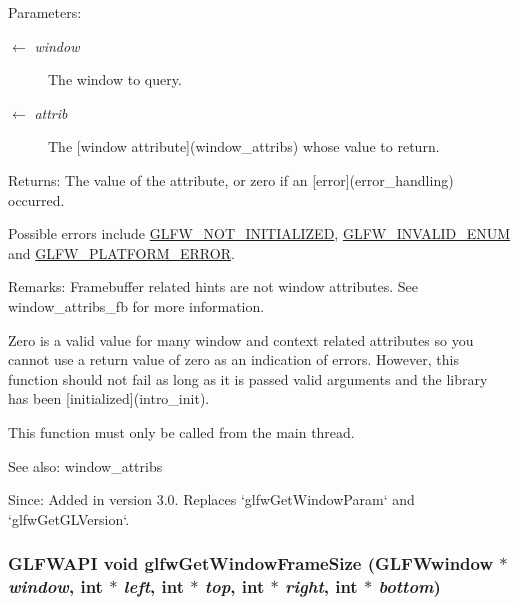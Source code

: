 \begin{Desc}
\item[Parameters:]
\begin{description}
\item[\mbox{$\leftarrow$} {\em window}]The window to query. \item[\mbox{$\leftarrow$} {\em attrib}]The \mbox{[}window attribute\mbox{]}(window\_\-attribs) whose value to return. \end{description}
\end{Desc}
\begin{Desc}
\item[Returns:]The value of the attribute, or zero if an \mbox{[}error\mbox{]}(error\_\-handling) occurred.\end{Desc}
Possible errors include \hyperlink{group__errors_g2374ee02c177f12e1fa76ff3ed15e14a}{GLFW\_\-NOT\_\-INITIALIZED}, \hyperlink{group__errors_g76f6bb9c4eea73db675f096b404593ce}{GLFW\_\-INVALID\_\-ENUM} and \hyperlink{group__errors_gd44162d78100ea5e87cdd38426b8c7a1}{GLFW\_\-PLATFORM\_\-ERROR}.

\begin{Desc}
\item[Remarks:]Framebuffer related hints are not window attributes. See window\_\-attribs\_\-fb for more information.

Zero is a valid value for many window and context related attributes so you cannot use a return value of zero as an indication of errors. However, this function should not fail as long as it is passed valid arguments and the library has been \mbox{[}initialized\mbox{]}(intro\_\-init).\end{Desc}
This function must only be called from the main thread.

\begin{Desc}
\item[See also:]window\_\-attribs\end{Desc}
\begin{Desc}
\item[Since:]Added in version 3.0. Replaces `glfwGetWindowParam` and `glfwGetGLVersion`. \end{Desc}
\hypertarget{group__window_gad46cdaae2eb732f68d3a1499a7c5409}{
\subsubsection[glfwGetWindowFrameSize]{\setlength{\rightskip}{0pt plus 5cm}GLFWAPI void glfwGetWindowFrameSize ({\bf GLFWwindow} $\ast$ {\em window}, \/  int $\ast$ {\em left}, \/  int $\ast$ {\em top}, \/  int $\ast$ {\em right}, \/  int $\ast$ {\em bottom})}}
\label{group__window_gad46cdaae2eb732f68d3a1499a7c5409}


